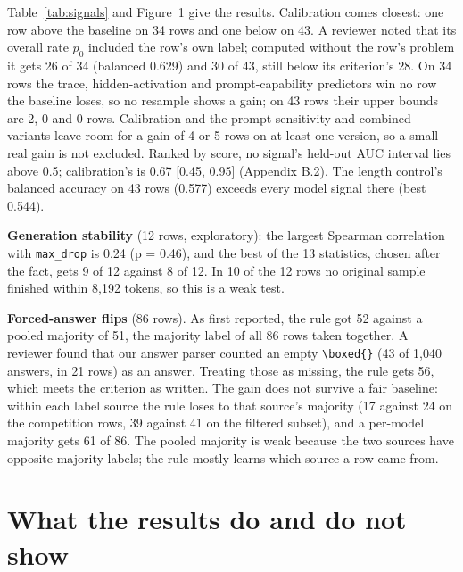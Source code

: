 \documentclass{article}
\begin{document}
Table~\ref{tab:signals} and Figure~1 give the results. Calibration comes closest: one row above the baseline on 34 rows and one below on 43. A reviewer noted that its overall rate $p_0$ included the row's own label; computed without the row's problem it gets 26 of 34 (balanced 0.629) and 30 of 43, still below its criterion's 28. On 34 rows the trace, hidden-activation and prompt-capability predictors win no row the baseline loses, so no resample shows a gain; on 43 rows their upper bounds are 2, 0 and 0 rows. Calibration and the prompt-sensitivity and combined variants leave room for a gain of 4 or 5 rows on at least one version, so a small real gain is not excluded. Ranked by score, no signal's held-out AUC interval lies above 0.5; calibration's is 0.67 {[}0.45, 0.95{]} (Appendix B.2). The length control's balanced accuracy on 43 rows (0.577) exceeds every model signal there (best 0.544).

\textbf{Generation stability} (12 rows, exploratory): the largest Spearman correlation with \texttt{max\_drop} is 0.24 (p = 0.46), and the best of the 13 statistics, chosen after the fact, gets 9 of 12 against 8 of 12. In 10 of the 12 rows no original sample finished within 8,192 tokens, so this is a weak test.

\textbf{Forced-answer flips} (86 rows). As first reported, the rule got 52 against a pooled majority of 51, the majority label of all 86 rows taken together. A reviewer found that our answer parser counted an empty \texttt{\textbackslash boxed\{\}} (43 of 1,040 answers, in 21 rows) as an answer. Treating those as missing, the rule gets 56, which meets the criterion as written. The gain does not survive a fair baseline: within each label source the rule loses to that source's majority (17 against 24 on the competition rows, 39 against 41 on the filtered subset), and a per-model majority gets 61 of 86. The pooled majority is weak because the two sources have opposite majority labels; the rule mostly learns which source a row came from.

\section{What the results do and do not show}
\end{document}
